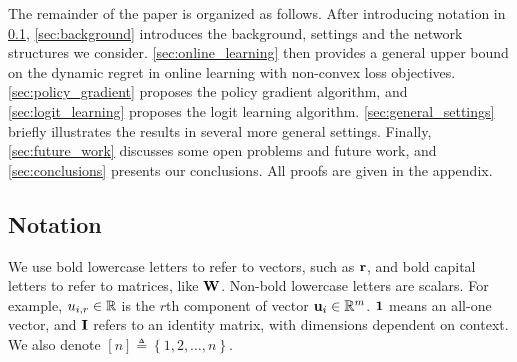 



The remainder of the paper is organized as follows. After introducing notation in \cref{subsec:notations},
 \cref{sec:background} introduces the background, settings and the network structures we consider. 
 \cref{sec:online_learning} then provides a general upper bound on the dynamic regret in online learning with non-convex loss objectives.
 \cref{sec:policy_gradient} proposes the policy gradient algorithm,
 and \cref{sec:logit_learning} proposes the logit learning algorithm. \cref{sec:general_settings} briefly illustrates the results in several more general settings. Finally, \cref{sec:future_work} discusses some open problems and future work, and \cref{sec:conclusions} presents our conclusions. All proofs are given in the appendix. %

\subsection{Notation}
\label{subsec:notations}
We use bold lowercase letters to refer to vectors, such as ${\mathbf{r}}$, and bold capital letters to refer to matrices, like ${\mathbf{W}}$. Non-bold lowercase letters are scalars. For example, $u_{i,r} \in {\mathbb{R}}$ is the $r$th component of vector ${\mathbf{u}}_i \in {\mathbb{R}}^m$. ${\mathbf{1}}$ means an all-one vector, and ${\mathbf{I}}$ refers to an identity matrix, with dimensions dependent on context. We also denote $[n] \triangleq \left\{ 1,2, \dots, n \right\}$. 

